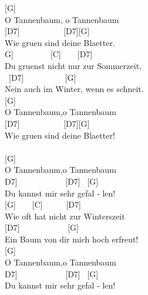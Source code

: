 \documentclass[
  letterpaper,
]{scrbook}
\begin{document}
{[}G{]} ~ ~ ~ ~ ~\\
O Tannenbaum, o Tannenbaum\\
\hspace*{0.333em} {[}D7{]} ~ ~ ~ ~ ~ ~ {[}D7{]}{[}G{]} ~ ~ ~\\
Wie gruen sind deine Blaetter.\\
\hspace*{0.333em}{[}G{]} ~ ~ ~ ~ ~ {[}C{]} ~ ~ {[}D7{]} ~ ~\\
Du gruenst nicht nur zur Sommerzeit,\\
\hspace*{0.333em} ~{[}D7{]} ~ ~ ~ ~ ~ ~{[}G{]} ~ ~\\
Nein auch im Winter, wenn es schneit.\\
{[}G{]} ~ ~ ~\\
O Tannenbaum,o Tannenbaum\\
\hspace*{0.333em} {[}D7{]} ~ ~ ~ ~ ~ ~ {[}D7{]}{[}G{]} ~ ~\\
Wie gruen sind deine Blaetter!\\
\hspace*{0.333em}\\
{[}G{]} ~\\
O Tannenbaum,o Tannenbaum\\
\hspace*{0.333em}{[}D7{]} ~ ~ ~ ~ ~ ~ ~{[}D7{]} ~{[}G{]} ~ ~ ~\\
Du kannst mir sehr gefal - len!\\
\hspace*{0.333em} {[}G{]} ~ ~ {[}C{]} ~ ~ ~ {[}D7{]} ~ ~ ~\\
Wie oft hat nicht zur Winterszeit\\
\hspace*{0.333em} {[}D7{]} ~ ~ ~ ~ ~ ~ ~{[}G{]} ~ ~\\
Ein Baum von dir mich hoch erfreut!\\
{[}G{]} ~\\
O Tannenbaum,o Tannenbaum\\
\hspace*{0.333em}{[}D7{]} ~ ~ ~ ~ ~ ~ ~{[}D7{]} ~{[}G{]} ~ ~\\
Du kannst mir sehr gefal - len!
\end{document}
